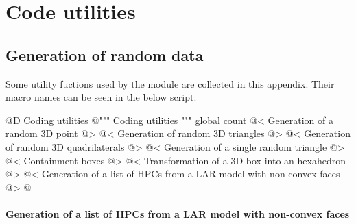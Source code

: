 \documentclass[11pt,oneside]{article}    %
\begin{document}
\appendix
\section{Code utilities}

\subsection{Generation of random data}

Some utility fuctions used by the module are collected in this appendix. Their macro names can be seen in the below script.

@D Coding utilities
@{""" Coding utilities """
global count
@< Generation of a random 3D point @>
@< Generation of random 3D triangles @>
@< Generation of random 3D quadrilaterals @>
@< Generation of a single random triangle @>
@< Containment boxes @>
@< Transformation of a 3D box into an hexahedron @>
@< Generation of a list of HPCs from a LAR model with non-convex faces @>
@}


\paragraph{Generation of a list of HPCs from a LAR model with non-convex faces}
\end{document}
